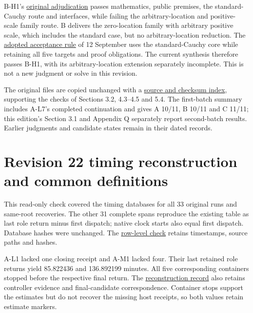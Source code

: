 B-H1's \href{verification/revision18/b-h1-assessment.json}{original adjudication} passes mathematics, public premises, the standard-Cauchy route and interfaces, while failing the arbitrary-location and positive-scale family route. B delivers the zero-location family with arbitrary positive scale, which includes the standard case, but no arbitrary-location reduction. The \href{verification/revision18/current-acceptance.zh-CN.md}{adopted acceptance rule} of 12 September uses the standard-Cauchy core while retaining all five targets and proof obligations. The current synthesis therefore passes B-H1, with its arbitrary-location extension separately incomplete. This is not a new judgment or solve in this revision.

The original files are copied unchanged with a \href{verification/revision18/SOURCE_INDEX.json}{source and checksum index}, supporting the checks of Sections 3.2, 4.3–4.5 and 5.4. The first-batch summary includes A-L7's completed continuation and gives A 10/11, B 10/11 and C 11/11; this edition's Section 3.1 and Appendix Q separately report second-batch results. Earlier judgments and candidate states remain in their dated records.

\section[Revision 22 timing reconstruction and common definitions]{\texorpdfstring{\protect\hypertarget{appendix-p}{}Revision 22 timing reconstruction and common definitions}{Revision 22 timing reconstruction and common definitions}}
This read-only check covered the timing databases for all 33 original runs and same-root recoveries. The other 31 complete spans reproduce the existing table as last role return minus first dispatch; native clock starts also equal first dispatch. Database hashes were unchanged. The \href{verification/revision22/comparability_008.json}{row-level check} retains timestamps, source paths and hashes.

A-L1 lacked one closing receipt and A-M1 lacked four. Their last retained role returns yield 85.822436 and 136.892199 minutes. All five corresponding containers stopped before the respective final return. The \href{verification/revision22/reconstruction.json}{reconstruction record} also retains controller evidence and final-candidate correspondence. Container stops support the estimates but do not recover the missing host receipts, so both values retain estimate markers.

